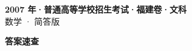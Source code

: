 \documentclass[zihao=-4, a4paper]{ctexart}
\begin{document}
\begin{center}
  {\Large\bfseries 2007 年·普通高等学校招生考试·福建卷·文科}\\[4pt]
  {\large 数学 · 简答版}
\end{center}
\medskip
{}

\clearpage
{}
\begin{center}{\Large\bfseries 答案速查}\end{center}
\medskip

\end{document}
